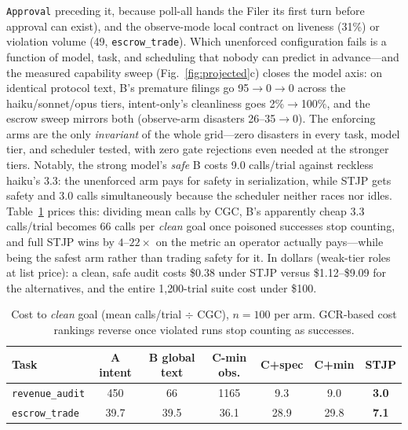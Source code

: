 \documentclass{article}
\newcommand{\stjp}{\textsc{STJP}}
\begin{document}
\texttt{Approval} preceding it, because poll-all hands the Filer its first turn before approval can exist), and the observe-mode local contract on liveness (31\%) or violation volume (49, \texttt{escrow\_trade}). Which unenforced configuration fails is a function of model, task, and scheduling that nobody can predict in advance---and the measured capability sweep (Fig.~\ref{fig:projected}c) closes the model axis: on identical protocol text, B's premature filings go 95$\to$0$\to$0 across the haiku/sonnet/opus tiers, intent-only's cleanliness goes 2\%$\to$100\%, and the escrow sweep mirrors both (observe-arm disasters 26--35$\to$0). The enforcing arms are the only \emph{invariant} of the whole grid---zero disasters in every task, model tier, and scheduler tested, with zero gate rejections even needed at the stronger tiers. Notably, the strong model's \emph{safe} B costs 9.0 calls/trial against reckless haiku's 3.3: the unenforced arm pays for safety in serialization, while \stjp{} gets safety and 3.0 calls simultaneously because the scheduler neither races nor idles. Table~\ref{tab:ctcg} prices this: dividing mean calls by CGC, B's apparently cheap 3.3 calls/trial becomes 66 calls per \emph{clean} goal once poisoned successes stop counting, and full \stjp{} wins by $4$--$22\times$ on the metric an operator actually pays---while being the safest arm rather than trading safety for it. In dollars (weak-tier roles at list price): a clean, safe audit costs \$0.38 under \stjp{} versus \$1.12--\$9.09 for the alternatives, and the entire 1{,}200-trial suite cost under \$100.

\begin{table}[t]
\centering\small
\caption{Cost to \emph{clean} goal (mean calls/trial $\div$ CGC), $n{=}100$ per arm. GCR-based cost rankings reverse once violated runs stop counting as successes.}
\label{tab:ctcg}
\begin{tabular}{@{}lcccccc@{}}
\toprule
\textbf{Task} & \textbf{A intent} & \textbf{B global text} & \textbf{C-min obs.} & \textbf{C+spec} & \textbf{C+min} & \textbf{\stjp{}} \\
\midrule
\texttt{revenue\_audit} & 450 & 66 & 1165 & 9.3 & 9.0 & \textbf{3.0} \\
\texttt{escrow\_trade} & 39.7 & 39.5 & 36.1 & 28.9 & 29.8 & \textbf{7.1} \\
\bottomrule
\end{tabular}
\end{table}
\end{document}
